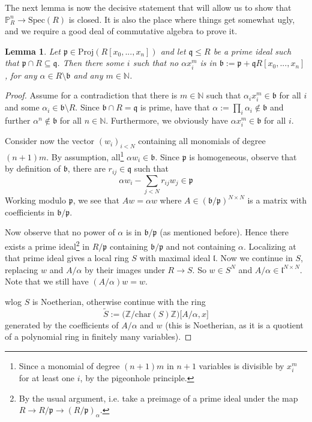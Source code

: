 \documentclass{scrartcl}
\newcommand{\N}{\mathbb{N}}
\newcommand{\Z}{\mathbb{Z}}
\renewcommand{\P}{\mathbb{P}}
\newcommand{\p}{\mathfrak{p}}
\newcommand{\q}{\mathfrak{q}}
\renewcommand{\b}{\mathfrak{b}}
\newcommand{\Spec}{\mathrm{Spec}}
\newcommand{\Proj}{\mathrm{Proj}}
\newtheorem{lemma}[subsection]{Lemma}
\theoremstyle{definition}
\begin{document}
The next lemma is now the decisive statement that will allow us to show that $\P_R^n \to \Spec(R)$ is closed.
It is also the place where things get somewhat ugly, and we require a good deal of commutative algebra to prove it.
\begin{lemma}
    \label{prop:adding_coeff_ideal_does_not_introduce_irrelevant_ideal}
    Let $\p \in \Proj(R[x_0, ..., x_n])$ and let $\q \leq R$ be a prime ideal such that $\p \cap R \subseteq \q$.
    Then there some $i$ such that no $\alpha x_i^m$ is in $\b := \p + \q R[x_0, ..., x_n]$, for any $\alpha \in R \setminus \b$ and any $m \in \N$.
\end{lemma}
\begin{proof}
    Assume for a contradiction  that there is $m \in \N$ such that $\alpha_i x_i^m \in \b$ for all $i$ and some $\alpha_i \in \b \setminus R$.
    Since $\b \cap R = \q$ is prime, have that $\alpha := \prod_i \alpha_i \notin \b$ and further $\alpha^n \notin \b$ for all $n \in \N$.
    Furthermore, we obviously have $\alpha x_i^m \in \b$ for all $i$.

    Consider now the vector $(w_i)_{i < N}$ containing all monomials of degree $(n + 1)m$.
    By assumption, all\footnote{Since a monomial of degree $(n + 1)m$ in $n + 1$ variables is divisible by $x_i^m$ for at least one $i$, by the pigeonhole principle.} $\alpha w_i \in \b$.
    Since $\p$ is homogeneous, observe that by definition of $\b$, there are $r_{ij} \in \q$ such that
    \begin{equation*}
        \alpha w_i - \sum_{j < N} r_{ij} w_j \in \p
    \end{equation*}
    Working modulo $\p$, we see that $A w = \alpha w$ where $A \in (\b/\p)^{N \times N}$ is a matrix with coefficients in $\b/\p$.

    Now observe that no power of $\alpha$ is in $\b/\p$ (as mentioned before).
    Hence there exists a prime ideal\footnote{By the usual argument, i.e. take a preimage of a prime ideal under the map $R \to R/\p \to (R/\p)_\alpha$.} in $R/\p$ containing $\b/\p$ and not containing $\alpha$.
    Localizing at that prime ideal gives a local ring $S$ with maximal ideal $\mathfrak{l}$.
    Now we continue in $S$, replacing $w$ and $A/\alpha$ by their images under $R \to S$.
    So $w \in S^N$ and $A/\alpha \in \mathfrak{l}^{N \times N}$.
    Note that we still have $(A/\alpha) w = w$.

    wlog $S$ is Noetherian, otherwise continue with the ring
    \begin{equation*}
        \tilde{S} := \bigl( \Z / \mathrm{char}(S) \Z \bigr) \bigl[ A/\alpha, x \bigr]
    \end{equation*}
    generated by the coefficients of $A/\alpha$ and $w$ (this is Noetherian, as it is a quotient of a polynomial ring in finitely many variables).
    

\end{proof}
\end{document}
